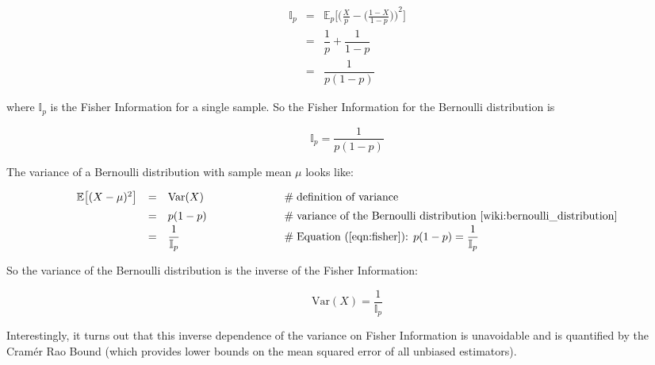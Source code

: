\documentclass{article}
\theoremstyle{definition}
\begin{document}
\begin{equation*}
\begin{array}{llll}
\mathbb{I}_p 
&=& \mathbb{E}_p \Bigg [{\bigg (\frac{X}{p} - 
    \Big(\frac{1-X}{1-p} \Big) \bigg)}^2\Bigg] \\
[15pt]
&=&\dfrac{1}{p} + \dfrac{1}{1 - p} \\
[15pt]
&=& \dfrac{1}{p (1-p)}
\end{array}
\end{equation*}

\bigskip
\noindent
where $\mathbb{I}_p$ is the Fisher Information for
a single sample. So the Fisher Information
for the Bernoulli distribution is 

\begin{equation}
\mathbb{I}_p = \frac{1}{p (1-p)}
\label{eqn:fisher}
\end{equation}


\bigskip
\noindent
The variance of a Bernoulli distribution with sample mean $\mu$
looks like:

\bigskip
\begin{equation*}
\begin{array}{llll}
\mathbb{E}\big [(X- \mu)^2 \big] 
&=& \mathrm{Var}(X)
		&\qquad \qquad \qquad \mathrel{\#} \text{definition of variance} \\ 
[5pt]
&=& p(1-p)
		&\qquad \qquad \qquad \mathrel{\#} \text{variance of the Bernoulli distribution
		                                  \cite{wiki:bernoulli_distribution}} \\ 
[2pt]		
&=& \dfrac{1}{\mathbb{I}_p}  
		&\qquad \qquad \qquad \mathrel{\#} \text{Equation (\ref{eqn:fisher}): }
		                            {\displaystyle p(1-p) = \frac{1}{\mathbb{I}_p}} \\
\end{array}
\end{equation*}

\bigskip
\noindent
So the variance of the Bernoulli distribution is the inverse of 
the Fisher Information:

\medskip
\begin{equation*}
\mathrm{Var}(X) = \frac{1}{\mathbb{I}_p} 
\end{equation*}

\bigskip
\noindent
Interestingly, it turns out that this inverse dependence of the 
variance on Fisher Information is unavoidable and is quantified 
by the Cram\'er Rao Bound (which provides lower bounds on the 
mean squared error of all unbiased estimators).
\end{document}
